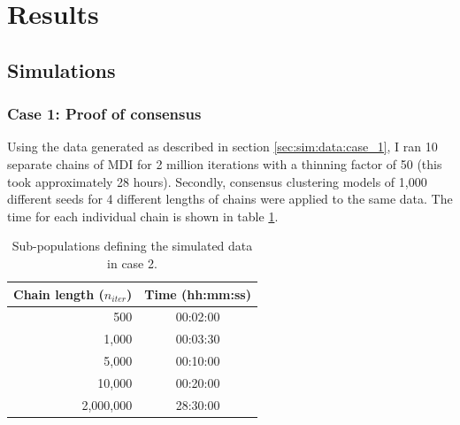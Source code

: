 \documentclass[12pt]{article} %
\begin{document}
	

	
	\section{Results}
	\subsection{Simulations}
	\subsubsection{Case 1: Proof of consensus} \label{sec:results:case_1}
	Using the data generated as described in section \ref{sec:sim:data:case_1}, I ran 10 separate chains of MDI for 2 million iterations with a thinning factor of 50 (this took approximately 28 hours). Secondly, consensus clustering models of 1,000 different seeds for 4 different lengths of chains were applied to the same data. The time for each individual chain is shown in table \ref{table:results:sim_1:timing}.
	
	\begin{table}[!htb] 
		\centering
		\begin{tabular}{r|c} 
			Chain length ($n_{iter}$)	& Time (hh:mm:ss)\\ 
			\hline
			500							& 00:02:00 \\
			1,000						& 00:03:30 \\
			5,000						& 00:10:00 \\
			10,000						& 00:20:00 \\
			2,000,000					& 28:30:00
		\end{tabular}
		\caption{Sub-populations defining the simulated data in case 2.}
		\label{table:results:sim_1:timing}
	\end{table}
\end{document}
